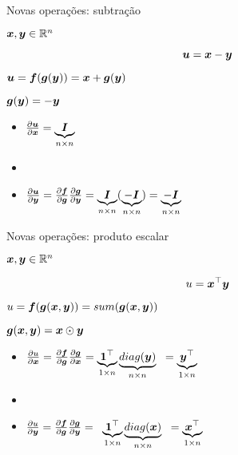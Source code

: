\documentclass[10pt]{beamer}
\begin{document}
\begin{frame}{Novas operações: subtração}

\Large{

$\bm{x},\bm{y} \in \mathbb{R}^{n}$

\vspace{0.3 cm}

\begin{equation*}
\bm{u} = \bm{x} - \bm{y}
\end{equation*}

$\bm{u} = \bm{f}(\bm{g}(\bm{y})) = \bm{x} + \bm{g}(\bm{y})$

$\bm{g}(\bm{y}) = - \bm{y}$


\vspace{0.3 cm}
\begin{itemize}
\item $\frac{\partial \bm{u}}{\partial \bm{x}} = \underbrace{\bm{I}}_{\tiny{n \times n}}$
\item[]
\item $\frac{\partial \bm{u}}{\partial \bm{y}} = \frac{\partial \bm{f}}{\partial \bm{g}} \frac{\partial \bm{g}}{\partial \bm{y}} = \underbrace{\bm{I}}_{\tiny{n \times n}} (\underbrace{-\bm{I}}_{\tiny{n \times n}}) = \underbrace{-\bm{I}}_{\tiny{n \times n}}$
\end{itemize}
}
\end{frame}


\begin{frame}{Novas operações: produto escalar}
\Large{

$\bm{x},\bm{y} \in \mathbb{R}^{n}$

\vspace{0.1 cm}

\begin{equation*}
u = \bm{x}^{\top}\bm{y}
\end{equation*}

\vspace{0.2 cm}
$u = \bm{f}(\bm{g}(\bm{x},\bm{y})) = sum(\bm{g}(\bm{x}, \bm{y}))$

\vspace{0.2 cm}
$\bm{g}(\bm{x}, \bm{y}) = \bm{x} \odot \bm{y}$


\vspace{0.2 cm}
\begin{itemize}
\item $\frac{\partial u}{\partial \bm{x}} = \frac{\partial \bm{f}}{\partial \bm{g}} \frac{\partial \bm{g}}{\partial \bm{x}} = \underbrace{\bm{1}^{\top}}_{\tiny{1 \times n}} \underbrace{diag(\bm{y})}_{\tiny{n \times n}} \;\; = \underbrace{\bm{y}^{\top}}_{\tiny{1 \times n}}$
\item[]
\item $\frac{\partial u}{\partial \bm{y}} = \frac{\partial \bm{f}}{\partial \bm{g}} \frac{\partial \bm{g}}{\partial \bm{y}} = \;\; \underbrace{\bm{1}^{\top}}_{\tiny{1 \times n}} \underbrace{diag(\bm{x})}_{\tiny{n \times n}} \;\; = \underbrace{\bm{x}^{\top}}_{\tiny{1 \times n}}$
\end{itemize}
}
\end{frame}
\end{document}
